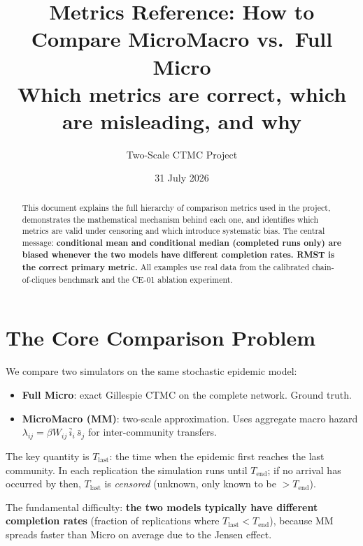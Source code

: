 \documentclass[11pt,a4paper]{article}
\title{\textbf{Metrics Reference: How to Compare MicroMacro vs.\ Full Micro}\\[0.5em]
\large Which metrics are correct, which are misleading, and why}
\author{Two-Scale CTMC Project}
\date{31 July 2026}
\begin{document}
\maketitle

\begin{abstract}
This document explains the full hierarchy of comparison metrics used in the
project, demonstrates the mathematical mechanism behind each one, and identifies
which metrics are valid under censoring and which introduce systematic bias.
The central message: \textbf{conditional mean and conditional median (completed
runs only) are biased whenever the two models have different completion rates.
RMST is the correct primary metric.}
All examples use real data from the calibrated chain-of-cliques benchmark
and the CE-01 ablation experiment.
\end{abstract}

\tableofcontents
\clearpage

\section{The Core Comparison Problem}

We compare two simulators on the same stochastic epidemic model:
\begin{itemize}
  \item \textbf{Full Micro}: exact Gillespie CTMC on the complete network.
        Ground truth.
  \item \textbf{MicroMacro (MM)}: two-scale approximation.
        Uses aggregate macro hazard $\lambda_{ij} = \beta W_{ij}\,\bar{i}_i\,\bar{s}_j$
        for inter-community transfers.
\end{itemize}

The key quantity is $T_{\mathrm{last}}$: the time when the epidemic first
reaches the last community.  In each replication the simulation runs until
$T_{\mathrm{end}}$; if no arrival has occurred by then, $T_{\mathrm{last}}$
is \emph{censored} (unknown, only known to be $> T_{\mathrm{end}}$).

The fundamental difficulty: \textbf{the two models typically have different
completion rates} (fraction of replications where $T_{\mathrm{last}} <
T_{\mathrm{end}}$), because MM spreads faster than Micro on average due to
the Jensen effect.

\end{document}
